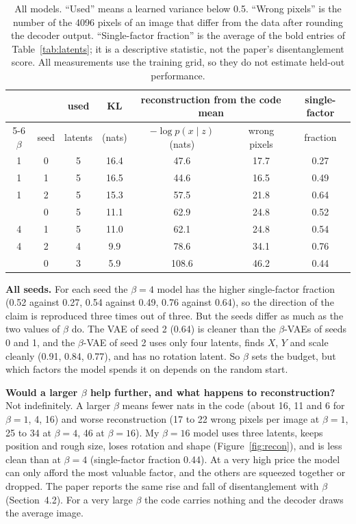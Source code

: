 \begin{table}[tb]\centering\small
  \begin{tabular}{@{}cc c c cc c@{}}
    \toprule
    & & used & KL & \multicolumn{2}{c}{reconstruction from the code mean} & single-factor\\
    \cmidrule(lr){5-6}
    $\beta$ & seed & latents & (nats) & $-\log p(x\mid z)$ (nats) & wrong pixels & fraction\\
    \midrule
    1 & 0 & 5 & 16.4 & 47.6 & 17.7 & 0.27\\
    1 & 1 & 5 & 16.5 & 44.6 & 16.5 & 0.49\\
    1 & 2 & 5 & 15.3 & 57.5 & 21.8 & 0.64\\
    \addlinespace
    4 & 0 & 5 & 11.1 & 62.9 & 24.8 & 0.52\\
    4 & 1 & 5 & 11.0 & 62.1 & 24.8 & 0.54\\
    4 & 2 & 4 & 9.9 & 78.6 & 34.1 & 0.76\\
    \addlinespace
    16 & 0 & 3 & 5.9 & 108.6 & 46.2 & 0.44\\
    \bottomrule
  \end{tabular}
  \caption{All models. ``Used'' means a learned variance below 0.5. ``Wrong pixels'' is the number of the 4096 pixels of an image that differ from the data after rounding the decoder output. ``Single-factor fraction'' is the average of the bold entries of Table~\ref{tab:latents}; it is a descriptive statistic, not the paper's disentanglement score. All measurements use the training grid, so they do not estimate held-out performance.}
  \label{tab:seeds}
\end{table}

\textbf{All seeds.} For each seed the $\beta=4$ model has the higher single-factor fraction (0.52 against 0.27, 0.54 against 0.49, 0.76 against 0.64), so the direction of the claim is reproduced three times out of three. But the seeds differ as much as the two values of $\beta$ do. The VAE of seed 2 (0.64) is cleaner than the $\beta$-VAEs of seeds 0 and 1, and the $\beta$-VAE of seed 2 uses only four latents, finds $X$, $Y$ and scale cleanly (0.91, 0.84, 0.77), and has no rotation latent. So $\beta$ sets the budget, but which factors the model spends it on depends on the random start.

\textbf{Would a larger $\beta$ help further, and what happens to reconstruction?} Not indefinitely. A larger $\beta$ means fewer nats in the code (about 16, 11 and 6 for $\beta=1$, 4, 16) and worse reconstruction (17 to 22 wrong pixels per image at $\beta=1$, 25 to 34 at $\beta=4$, 46 at $\beta=16$). My $\beta=16$ model uses three latents, keeps position and rough size, loses rotation and shape (Figure~\ref{fig:recon}), and is less clean than at $\beta=4$ (single-factor fraction 0.44). At a very high price the model can only afford the most valuable factor, and the others are squeezed together or dropped. The paper reports the same rise and fall of disentanglement with $\beta$ (Section~4.2). For a very large $\beta$ the code carries nothing and the decoder draws the average image.

